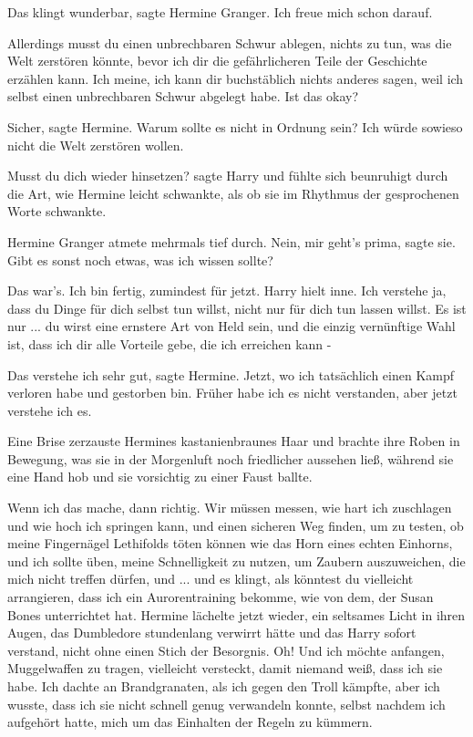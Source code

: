 \glqq{}Das klingt wunderbar\grqq{}, sagte Hermine Granger. \glqq{}Ich freue mich
schon darauf.\grqq{}

\glqq{}Allerdings musst du einen unbrechbaren Schwur ablegen, nichts zu tun, was
die Welt zerstören könnte, bevor ich dir die gefährlicheren Teile der Geschichte
erzählen kann. Ich meine, ich kann dir buchstäblich nichts anderes sagen, weil
ich selbst einen unbrechbaren Schwur abgelegt habe. Ist das okay?\grqq{}

\glqq{}Sicher\grqq{}, sagte Hermine. \glqq{}Warum sollte es nicht in Ordnung sein?
Ich würde sowieso nicht die Welt zerstören wollen.\grqq{}

\glqq{}Musst du dich wieder hinsetzen?\grqq{} sagte Harry und fühlte sich
beunruhigt durch die Art, wie Hermine leicht schwankte, als ob sie im Rhythmus
der gesprochenen Worte schwankte.

Hermine Granger atmete mehrmals tief durch. \glqq{}Nein, mir geht's prima\grqq{},
sagte sie. \glqq{}Gibt es sonst noch etwas, was ich wissen sollte?\grqq{}

\glqq{}Das war's. Ich bin fertig, zumindest für jetzt.\grqq{} Harry hielt inne. \glqq{}
Ich verstehe ja, dass du Dinge für dich selbst tun willst, nicht nur für dich
tun lassen willst. Es ist nur ... du wirst eine ernstere Art von Held sein, und
die einzig vernünftige Wahl ist, dass ich dir alle Vorteile gebe, die ich
erreichen kann -\grqq{}

\glqq{}Das verstehe ich sehr gut\grqq{}, sagte Hermine. \glqq{}Jetzt, wo ich
tatsächlich einen Kampf verloren habe und gestorben bin. Früher habe ich es
nicht verstanden, aber jetzt verstehe ich es.\grqq{}

Eine Brise zerzauste Hermines kastanienbraunes Haar und brachte ihre Roben in
Bewegung, was sie in der Morgenluft noch friedlicher aussehen ließ, während sie
eine Hand hob und sie vorsichtig zu einer Faust ballte.

\glqq{}Wenn ich das mache, dann richtig. Wir müssen messen, wie hart ich
zuschlagen und wie hoch ich springen kann, und einen sicheren Weg finden, um zu
testen, ob meine Fingernägel Lethifolds töten können wie das Horn eines echten
Einhorns, und ich sollte üben, meine Schnelligkeit zu nutzen, um Zaubern
auszuweichen, die mich nicht treffen dürfen, und ... und es klingt, als könntest
du vielleicht arrangieren, dass ich ein Aurorentraining bekomme, wie von dem,
der Susan Bones unterrichtet hat.\grqq{} Hermine lächelte jetzt wieder, ein seltsames
Licht in ihren Augen, das Dumbledore stundenlang verwirrt hätte und das Harry
sofort verstand, nicht ohne einen Stich der Besorgnis. \glqq{}Oh! Und ich möchte
anfangen, Muggelwaffen zu tragen, vielleicht versteckt, damit niemand weiß, dass
ich sie habe. Ich dachte an Brandgranaten, als ich gegen den Troll kämpfte, aber
ich wusste, dass ich sie nicht schnell genug verwandeln konnte, selbst nachdem
ich aufgehört hatte, mich um das Einhalten der Regeln zu kümmern.\grqq{}

